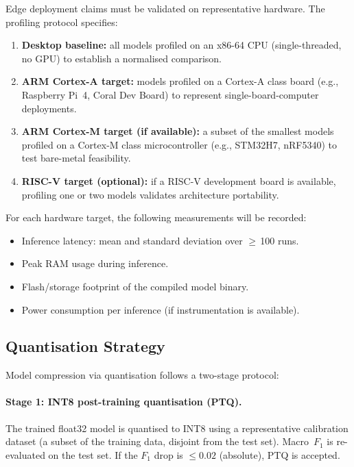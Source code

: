 Edge deployment claims must be validated on representative hardware.
The profiling protocol specifies:

\begin{enumerate}
  \item \textbf{Desktop baseline:} all models profiled on an x86-64
        CPU (single-threaded, no GPU) to establish a normalised
        comparison.
  \item \textbf{ARM Cortex-A target:} models profiled on a
        Cortex-A class board (e.g., Raspberry Pi~4, Coral Dev Board)
        to represent single-board-computer deployments.
  \item \textbf{ARM Cortex-M target (if available):} a subset of
        the smallest models profiled on a Cortex-M class
        microcontroller (e.g., STM32H7, nRF5340) to test
        bare-metal feasibility.
  \item \textbf{RISC-V target (optional):} if a RISC-V development
        board is available, profiling one or two models validates
        architecture portability.
\end{enumerate}

For each hardware target, the following measurements will be recorded:
%
\begin{itemize}
  \item Inference latency: mean and standard deviation over
        $\geq$\,\num{100} runs.
  \item Peak RAM usage during inference.
  \item Flash/storage footprint of the compiled model binary.
  \item Power consumption per inference (if instrumentation is
        available).
\end{itemize}


\subsection{Quantisation Strategy}
\label{subsec:quantisation}

Model compression via quantisation follows a two-stage protocol:

\paragraph{Stage 1: INT8 post-training quantisation (PTQ).}
The trained float32 model is quantised to INT8 using a representative
calibration dataset (a subset of the training data, disjoint from
the test set).  Macro~$F_1$ is re-evaluated on the test set.  If the
$F_1$ drop is $\leq 0.02$ (absolute), PTQ is accepted.

